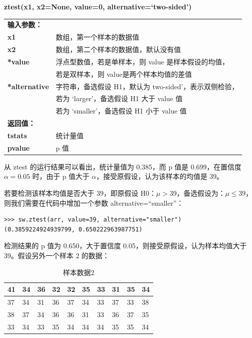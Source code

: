  \begin{center}
 \begin{tcolorbox}[title = ztest 函数的语法]
 \textbf{ztest(x1, x2=None, value=0, alternative=`two-sided')}
 \tcblower
 \vspace{2pt}
 \begin{tcboutputlisting}
 \begin{tabular}{>{\bfseries}ll}
   输入参数：&\\
   x1 &数组，第一个样本的数据值\\
   x2 & 数组，第二个样本的数据值，默认没有值\\
   \specialrule{0em}{2pt}{2pt}
\multirow{2}*{value} &浮点型数值，若是单样本，则 value 是样本假设的均值，\\
&若是双样本，则 value是两个样本均值的差值\\
\specialrule{0em}{2pt}{2pt}
 \multirow{3}*{alternative}&字符串，备选假设 H1，默认为 two-sided'，表示双侧检验，\\
 & 若为 `larger'，备选假设 H1 大于 value 值\\
 & 若为 `smaller'，备选假设 H1 小于 value 值\\
\specialrule{0em}{2pt}{2pt}
 返回值：&\\
 tstats & 统计量值\\
 pvalue & p 值
 \end{tabular}
 \end{tcboutputlisting}
 \tcbuselistingtext

  \end{tcolorbox}
  \end{center}


从 ztest 的运行结果可以看出，统计量值为 0.385，而 p 值是 0.699，在置信度 $\alpha=0.05$ 时，由于 p 值大于 $\alpha$，接受原假设，认为该样本的均值是 39。

若要检测该样本均值是否大于 39，即原假设 H0：$\mu>39$，备选假设为：$\mu\leq 39$，则我们需要在代码中增加一个参数 alternative=``smaller”：

\begin{lstlisting}[Language=Python]
>>> sw.ztest(arr, value=39, alternative="smaller")
(0.3859224924939799, 0.650222963987751)
\end{lstlisting}

检测结果的 p 值为 0.650，大于置信度 0.05，则接受原假设，认为样本均值大于39。假设另外一个样本 2 的数据：

\begin{table}[ht]
\centering
\caption{样本数据2}
\begin{tabular}{|l|l|l|l|l|l|l|l|l|l|}
\hline
41  & 34  & 36  & 32  & 32  & 35  & 33  & 31  & 35  & 34  \\ \hline
37  & 34  & 31  & 36  & 37  & 34  & 33  & 37  & 33  & 38  \\ \hline
38  & 37  & 34  & 36  & 36  & 31  & 33  & 36  & 37  & 35  \\ \hline
33  & 34  & 33  & 35  & 34  & 34  & 34  & 35  & 35  & 34 \\ \hline
\end{tabular}
\end{table}

